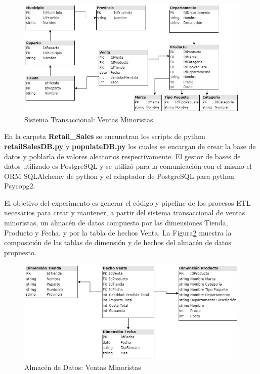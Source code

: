 \begin{figure}[ht]
    \centering
    \includegraphics[scale=0.7]{../document/Graphics/retailSales-Transactional.jpg}
    \caption{Sistema Transaccional: Ventas Minoristas}
    \label{fig:retail-transactional}
  \end{figure}

En la carpeta \textbf{Retail\_Sales} se encunetran los scripts de python \textbf{retailSalesDB.py} y \textbf{populateDB.py} 
los cuales se encargan de crear la base de datos y poblarla de valores aleatorios respectivamente. El gestor de bases de 
datos utilizado es PostgreSQL y se utilizó para la comunicación con el mismo el ORM SQLAlchemy de python y el adaptador 
de PostgreSQL para python Psycopg2.

El objetivo del experimento es generar el c\'odigo y pipeline de los procesos ETL necesarios para crear y mantener,
a partir del sistema transaccional de ventas minoristas, un almacén de datos compuesto por las dimensiones Tienda, 
Producto y Fecha, y por la tabla de hechos Venta. La Figura\ref{fig:retail-Warehouse} muestra la composición de las 
tablas de dimensión y de hechos del almacén de datos propuesto.

\begin{figure}
    \centering
    \includegraphics[scale=0.5]{../document/Graphics/retailSales-Data Warehouse.jpg}
    \caption{Almacén de Datos: Ventas Minoristas}
    \label{fig:retail-Warehouse}
  \end{figure}
